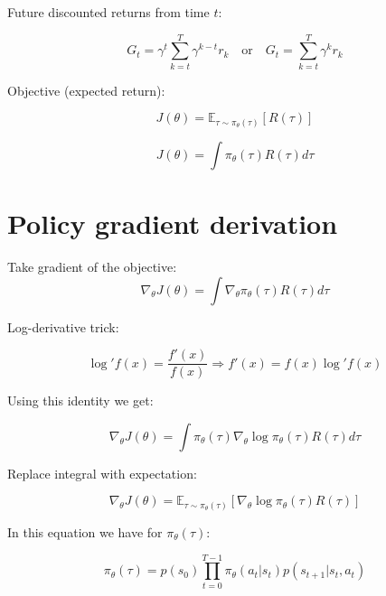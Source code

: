 \documentclass[preprint,12pt]{elsarticle}
\begin{document}
Future discounted returns from time $t$:

\begin{equation}
\label{eq:future-discounted-return}
G_t = \gamma^t \sum_{k=t}^T \gamma^{k-t} r_k
\quad \text{or} \quad
G_t = \sum_{k=t}^T \gamma^k r_k
\end{equation}

Objective (expected return):

\begin{equation}
\label{eq:objective-expectation}
J(\theta) = \mathbb{E}_{\tau \sim \pi_\theta(\tau)} [R(\tau)]
\end{equation}

\begin{equation}
\label{eq:objective-integral}
J(\theta) = \int \pi_\theta(\tau)R(\tau) d\tau
\end{equation}

\section*{Policy gradient derivation}
Take gradient of the objective:
\begin{equation}
\label{eq:objective-gradient-integral}
\nabla_\theta J(\theta) = \int \nabla_\theta \pi_\theta(\tau)R(\tau) d\tau
\end{equation}

Log-derivative trick:

\begin{equation}
\label{eq:log-derivative-trick}
\log' f(x)= \frac {f'(x) } {f(x)} \Rightarrow f'(x) =f(x) \log' f(x)
\end{equation}

%
Using this identity we get:

\begin{equation}
\label{eq:score-function-integral}
\nabla_\theta J(\theta) = \int \pi_\theta(\tau) \nabla_\theta \log \pi_\theta(\tau) R(\tau) d\tau
\end{equation}

Replace integral with expectation:

\begin{equation}
\label{eq:score-function-expectation}
\nabla_\theta J(\theta) = \mathbb{E}_{\tau \sim \pi_\theta(\tau)} [\nabla_\theta \log \pi_\theta(\tau) R(\tau)]
\end{equation}

In this equation we have for $\pi_\theta(\tau)$:

\begin{equation}
\label{eq:trajectory-probability}
\pi_\theta(\tau) = p(s_0) \prod_{t=0}^{T-1} \pi_\theta(a_t|s_t) p(s_{t+1}|s_t, a_t)
\end{equation}
\end{document}
